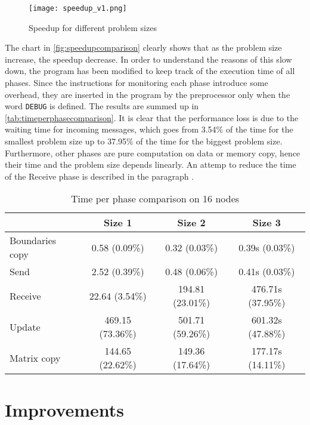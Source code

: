 \documentclass{article}
\begin{document}
\begin{figure}
\centering
\texttt{[image: speedup\_v1.png]}
\caption{Speedup for different problem sizes}
\label{fig:speedupcomparison}
\end{figure}

The chart in \autoref{fig:speedupcomparison} clearly shows that as the problem size increase, the speedup decrease. In order to understand the reasons of this slow down, the program has been modified to keep track of the execution time of all phases. Since the instructions for monitoring each phase introduce some overhead, they are inserted in the program by the preprocessor only when the word \texttt{DEBUG} is defined. The results are summed up in \autoref{tab:timeperphasecomparison}. It is clear that the performance loss is due to the waiting time for incoming messages, which goes from 3.54\% of the time for the smallest problem size up to 37.95\% of the time for the biggest problem size. Furthermore, other phases are pure computation on data or memory copy, hence their time and the problem size depends linearly. An attemp to reduce the time of the Receive phase is described in the paragraph .


\begin{table}
\centering
\begin{tabular}{|l|c|c|c|}
\hline
& Size 1 & Size 2 & Size 3\\
\hline
Boundaries copy & 0.58 (0.09\%) & 0.32 (0.03\%) & 0.39s (0.03\%) \\
\hline
Send & 2.52 (0.39\%) & 0.48 (0.06\%) & 0.41s (0.03\%) \\
\hline
Receive & 22.64 (3.54\%) & 194.81 (23.01\%) & 476.71s (37.95\%) \\
\hline
Update & 469.15 (73.36\%) & 501.71 (59.26\%) & 601.32s (47.88\%) \\
\hline
Matrix copy & 144.65 (22.62\%) & 149.36 (17.64\%) & 177.17s (14.11\%) \\
\hline
\end{tabular}
\caption{Time per phase comparison on 16 nodes} \label{tab:timeperphasecomparison}
\end{table}



\section{Improvements}
\end{document}
